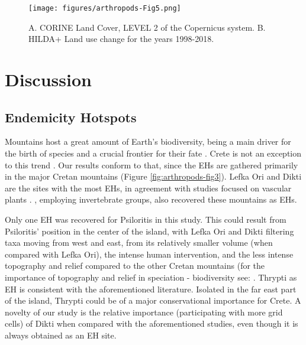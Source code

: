    \begin{figure}[ht]
      \centering
      \texttt{[image: figures/arthropods-Fig5.png]}
      \caption[Land Use of Crete and the changes]{A. CORINE Land Cover, LEVEL 2 of the Copernicus system. B. HILDA+ Land use change for the years 1998-2018.}
      \label{fig:arthropods-fig5}
   \end{figure}


\section{Discussion}
\label{sec:arthropods-discussion}

    \subsection{Endemicity Hotspots}
    \label{subsec:arthropods-Endemicity-Hotspots}

Mountains host a great amount of Earth’s biodiversity, being a main driver for
the birth of species \parencite{antonelli2018geological,noroozi2018hotspots,rahbek2019building,rahbek2019humboldts}
and a crucial frontier for their fate \parencite{steinbauer2018accelerated,urban2018escalator}.
Crete is not an exception to this trend \parencite{kougioumoutzis2020plant,trigas2013elevational}.
Our results conform to that, since the EHs are gathered primarily in the major
Cretan mountains (Figure \ref{fig:arthropods-fig3}). Lefka Ori and Dikti are the sites with the most
EHs, in agreement with studies focused on vascular plants \parencite{dimitrakopoulos2004questioning,kougioumoutzis2020plant}.
\textcite{sfenthourakis2001hotspots}, employing invertebrate groups, also recovered these mountains as EHs.

Only one EH was recovered for Psiloritis in this study. This could result from
Psiloritis’ position in the center of the island, with Lefka Ori and Dikti
filtering taxa moving from west and east, from its relatively smaller volume
(when compared with Lefka Ori), the intense human intervention, and the less
intense topography and relief compared to the other Cretan mountains (for the
importance of topography and relief in speciation - biodiversity see: \textcite{igea2021global,muellner-riehl2019mountains,stuessy2006anagenetic}.
Thrypti as EH is consistent with the aforementioned literature. Isolated in the
far east part of the island, Thrypti could be of a major conservational importance for Crete.
A novelty of our study is the relative importance (participating with more grid cells)
of Dikti when compared with the aforementioned studies, even though it is always obtained as an EH site. 

